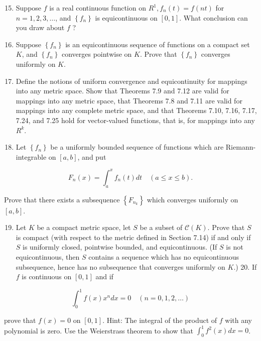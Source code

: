 \documentclass[10pt]{article}
\begin{document}
\begin{enumerate}
  \setcounter{enumi}{14}
  \item Suppose $f$ is a real continuous function on $R^{1}, f_{n}(t)=f(n t)$ for $n=1,2,3, \ldots$, and $\left\{f_{n}\right\}$ is equicontinuous on $[0,1]$. What conclusion can you draw about $f$ ?

  \item Suppose $\left\{f_{n}\right\}$ is an equicontinuous sequence of functions on a compact set $K$, and $\left\{f_{n}\right\}$ converges pointwise on $K$. Prove that $\left\{f_{n}\right\}$ converges uniformly on $K$.

  \item Define the notions of uniform convergence and equicontinuity for mappings into any metric space. Show that Theorems 7.9 and 7.12 are valid for mappings into any metric space, that Theorems 7.8 and 7.11 are valid for mappings into any complete metric space, and that Theorems 7.10, 7.16, 7.17, 7.24, and 7.25 hold for vector-valued functions, that is, for mappings into any $R^{k}$.

  \item Let $\left\{f_{n}\right\}$ be a uniformly bounded sequence of functions which are Riemann-integrable on $[a, b]$, and put

\end{enumerate}

$$
F_{n}(x)=\int_{a}^{x} f_{n}(t) d t \quad(a \leq x \leq b) .
$$

Prove that there exists a subsequence $\left\{F_{n_{k}}\right\}$ which converges uniformly on $[a, b]$.

\begin{enumerate}
  \setcounter{enumi}{18}
  \item Let $K$ be a compact metric space, let $S$ be a subset of $\mathscr{C}(K)$. Prove that $S$ is compact (with respect to the metric defined in Section 7.14) if and only if $S$ is uniformly closed, pointwise bounded, and equicontinuous. (If $S$ is not equicontinuous, then $S$ contains a sequence which has no equicontinuous subsequence, hence has no subsequence that converges uniformly on $K$.) 20. If $f$ is continuous on $[0,1]$ and if
\end{enumerate}

$$
\int_{0}^{1} f(x) x^{n} d x=0 \quad(n=0,1,2, \ldots)
$$

prove that $f(x)=0$ on $[0,1]$. Hint: The integral of the product of $f$ with any polynomial is zero. Use the Weierstrass theorem to show that $\int_{0}^{1} f^{2}(x) d x=0$.
\end{document}
